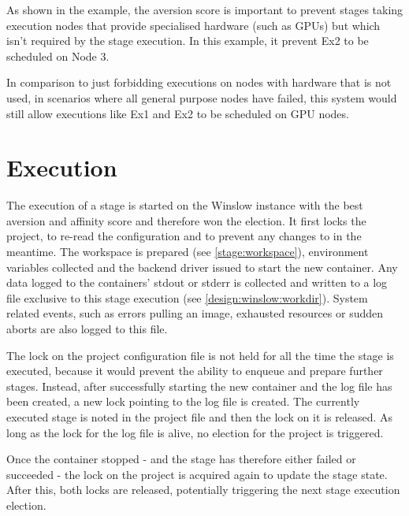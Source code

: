 As shown in the example, the aversion score is important to prevent stages taking execution nodes that provide specialised hardware (such as GPUs) but which isn't required by the stage execution.
In this example, it prevent Ex2 to be scheduled on Node 3.

In comparison to just forbidding executions on nodes with hardware that is not used, in scenarios where all general purpose nodes have failed, this system would still allow executions like Ex1 and Ex2 to be scheduled on GPU nodes.

\section{Execution}

The execution of a stage is started on the Winslow instance with the best aversion and affinity score and therefore won the election.
It first locks the project, to re-read the configuration and to prevent any changes to in the meantime.
The workspace is prepared (see \autoref{stage:workspace}), environment variables collected and the backend driver issued to start the new container.
Any data logged to the containers' stdout or stderr is collected and written to a log file exclusive to this stage execution (see \autoref{design:winslow:workdir}).
System related events, such as errors pulling an image, exhausted resources or sudden aborts are also logged to this file.

The lock on the project configuration file is not held for all the time the stage is executed, because it would prevent the ability to enqueue and prepare further stages.
Instead, after successfully starting the new container and the log file has been created, a new lock pointing to the log file is created.
The currently executed stage is noted in the project file and then the lock on it is released.
As long as the lock for the log file is alive, no election for the project is triggered.

Once the container stopped - and the stage has therefore either failed or succeeded - the lock on the project is acquired again to update the stage state.
After this, both locks are released, potentially triggering the next stage execution election.

